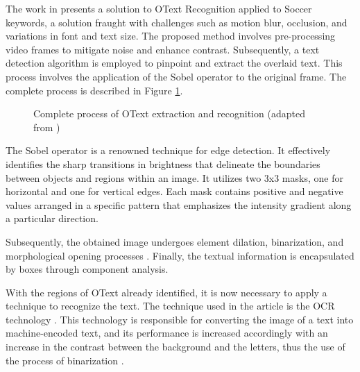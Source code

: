     The work in \cite{OTRecognition_SoccerConcepts} presents a solution to \gls{OText} Recognition applied to Soccer keywords, a solution fraught with challenges such as motion blur, occlusion, and variations in font and text size. The proposed method involves pre-processing video frames to mitigate noise and enhance contrast. Subsequently, a text detection algorithm is employed to pinpoint and extract the overlaid text. This process involves the application of the Sobel operator to the original frame. The complete process is described in Figure \ref{fig:OT_ExtractionRecognition}.

    \begin{figure}[htbp]
        \centering
        \fboxsep=0pt\fboxrule=0.5pt
        \caption{Complete process of \gls{OText} extraction and recognition (adapted from \cite{OTRecognition_SoccerConcepts})}
        \label{fig:OT_ExtractionRecognition}
    \end{figure}

    The Sobel operator \cite{SobelOperator} is a renowned technique for edge detection. It effectively identifies the sharp transitions in brightness that delineate the boundaries between objects and regions within an image. It utilizes two 3x3 masks, one for horizontal and one for vertical edges. Each mask contains positive and negative values arranged in a specific pattern that emphasizes the intensity gradient along a particular direction.

    Subsequently, the obtained image undergoes element dilation, binarization, and morphological opening processes \cite{MorphologicalTransformations}. Finally, the textual information is encapsulated by boxes through component analysis.

    With the regions of \gls{OText} already identified, it is now necessary to apply a technique to recognize the text. The technique used in the article is the \gls{OCR} technology \cite{OverviewTesseractOCREngine}. This technology is responsible for converting the image of a text into machine-encoded text, and its performance is increased accordingly with an increase in the contrast between the background and the letters, thus the use of the process of binarization \cite{ThresholdSelectionMethod}.

